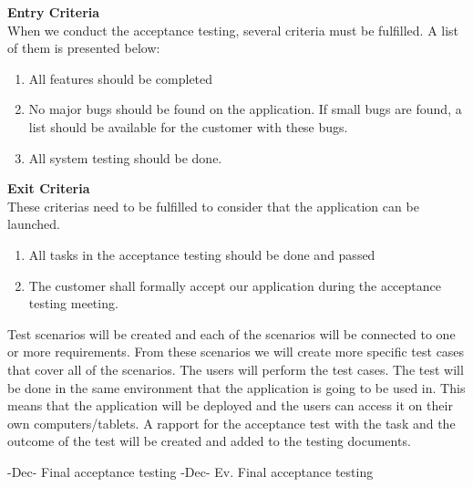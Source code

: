 \noindent \textbf{Entry Criteria}\\
When we conduct the acceptance testing, several criteria must be fulfilled. A list of them is presented below:
\begin{enumerate}
    \item All features should be completed
    \item No major bugs should be found on the application. If small bugs are found, a list should be available for the customer with these bugs.
    \item All system testing should be done.
\end{enumerate}

\noindent \textbf{Exit Criteria}\\
These criterias need to be fulfilled to consider that the application can be launched.
\begin{enumerate}
    \item All tasks in the acceptance testing should be done and passed
    \item The customer shall formally accept our application during the acceptance testing meeting.
\end{enumerate}

\noindent Test scenarios will be created and each of the scenarios will be connected to one or more requirements. From these scenarios we will create more specific test cases that cover all of the scenarios. The users will perform the test cases. The test will be done in the same environment that the application is going to be used in. This means that the application will be deployed and the users can access it on their own computers/tablets. A rapport for the acceptance test with the task and the outcome of the test will be created and added to the testing documents.
\newline


-Dec- Final acceptance testing\newline
{}-Dec- Ev. Final acceptance testing\newline

\begin{comment}
\subsection{Continuous Integration}
It is the practice of integrating changes from different developers in the team into a mainline as early as possible, in best cases several times a day. This makes sure the code individual developers work on doesn’t divert too much. When you combine the process with automated testing, continuous integration can enable your code to be dependable.(From internet)
\end{comment}
